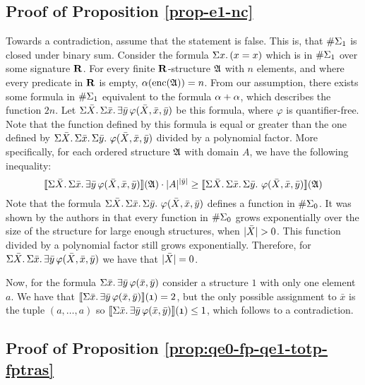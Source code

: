 \subsection*{Proof of Proposition \ref{prop-e1-nc}}

Towards a contradiction, assume that the statement is false. This is, that $\#\Sigma_{1}$ is closed under binary sum. Consider the formula $\Sigma{x}.\,(x = x)$ which is in $\#\Sigma_{1}$ over some signature $\mathbf{R}$. For every finite $\mathbf{R}$-structure $\mathfrak{A}$ with $n$ elements, and where every predicate in $\mathbf{R}$ is empty, $\alpha({\rm enc}(\mathfrak{A})) = n$. From our assumption, there exists some formula in $\#\Sigma_{1}$ equivalent to the formula $\alpha + \alpha$, which describes the function $2n$. Let $\Sigma{\bar{X}}.\,\Sigma{\bar{x}}.\,\exists\bar{y}\,\varphi(\bar{X},\bar{x},\bar{y})$ be this formula, where $\varphi$ is quantifier-free. Note that the function defined by this formula is equal or greater than the one defined by $\Sigma{\bar{X}}.\,\Sigma{\bar{x}}.\,\Sigma{\bar{y}}.\,\,\varphi(\bar{X},\bar{x},\bar{y})$ divided by a polynomial factor. More specifically, for each ordered structure $\mathfrak{A}$ with domain $A$, we have the following inequality:
$$
{\llbracket{}{\Sigma{\bar{X}}.\,\Sigma{\bar{x}}.\,\exists\bar{y}\,\varphi(\bar{X},\bar{x},\bar{y})}\rrbracket}(\mathfrak{A}) \cdot \vert A \vert^{\vert \bar{y} \vert} \geq {\llbracket{}{\Sigma{\bar{X}}.\,\Sigma{\bar{x}}.\,\Sigma{\bar{y}}.\,\,\varphi(\bar{X},\bar{x},\bar{y})}\rrbracket}(\mathfrak{A})
$$
Note that the formula $\Sigma{\bar{X}}.\,\Sigma{\bar{x}}.\,\Sigma{\bar{y}}.\,\,\varphi(\bar{X},\bar{x},\bar{y})$ defines a function in $\#\Sigma_{0}$. It was shown by the authors in \cite{SalujaST95} that every function in $\#\Sigma_{0}$ grows exponentially over the size of the structure for large enough structures, when $\vert \bar{X} \vert > 0$. This function divided by a polynomial factor still grows exponentially. Therefore, for $\Sigma{\bar{X}}.\,\Sigma{\bar{x}}.\,\exists\bar{y}\,\varphi(\bar{X},\bar{x},\bar{y})$ we have that $\vert \bar{X} \vert = 0$.

Now, for the formula $\Sigma{\bar{x}}.\,\exists\bar{y}\,\varphi(\bar{x},\bar{y})$ consider a structure $\mathfrak{1}$ with only one element $a$. We have that ${\llbracket{}{\Sigma{\bar{x}}.\,\exists\bar{y}\,\varphi(\bar{x},\bar{y})}\rrbracket}(\mathfrak{1}) = 2$, but the only possible assignment to $\bar{x}$ is the tuple $(a,\ldots,a)$ so ${\llbracket{}{\Sigma{\bar{x}}.\,\exists\bar{y}\,\varphi(\bar{x},\bar{y})}\rrbracket}(\mathfrak{1}) \leq 1$, which follows to a contradiction.










\subsection*{Proof of Proposition \ref{prop:qe0-fp-qe1-totp-fptras}}

